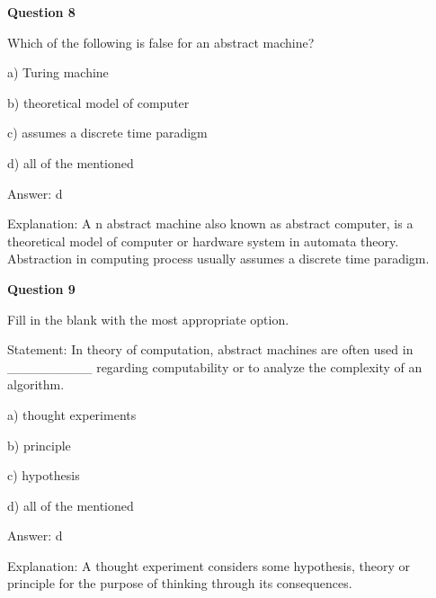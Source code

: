 \documentclass{article}
\begin{document}
\begin{mdframed}[linewidth=1pt, roundcorner=5pt, linecolor=gray!30, backgroundcolor=gray!5]
\textbf{Question 8} 

Which of the following is false for an abstract machine?

a) Turing machine

b) theoretical model of computer

c) assumes a discrete time paradigm

d) all of the mentioned
\vspace{5pt} \par
\begin{tcolorbox}[colback=green!5, colframe=green!40!black, title=Solution]
Answer: d

Explanation: A n abstract machine also known as abstract computer, is a theoretical model of computer or hardware system in automata theory. Abstraction in computing process usually assumes a discrete time paradigm.
\end{tcolorbox}
\end{mdframed}

\begin{mdframed}[linewidth=1pt, roundcorner=5pt, linecolor=gray!30, backgroundcolor=gray!5]
\textbf{Question 9} 

Fill in the blank with the most appropriate option.

Statement: In theory of computation, abstract machines are often used in \_\_\_\_\_\_\_\_\_ regarding computability or to analyze the complexity of an algorithm.

a) thought experiments

b) principle

c) hypothesis

d) all of the mentioned
\vspace{5pt} \par
\begin{tcolorbox}[colback=green!5, colframe=green!40!black, title=Solution]
Answer: d

Explanation: A thought experiment considers some hypothesis, theory or principle for the purpose of thinking through its consequences.
\end{tcolorbox}
\end{mdframed}
\newpage
\end{document}
